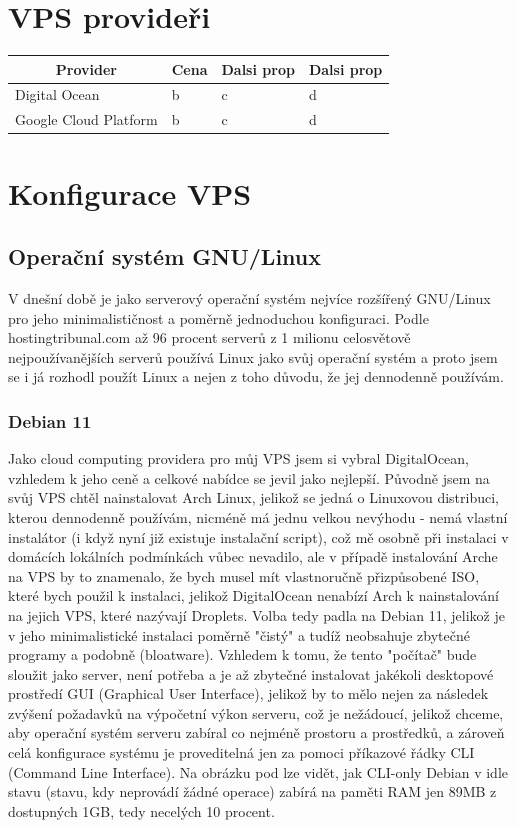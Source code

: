 \documentclass[12pt,a4paper]{report}
\begin{document}
  \section{VPS provideři}
  
  \begin{center}
    \begin{tabular}{|l|l|l|l|}
      \multicolumn{1}{c}{\bfseries Provider} & \multicolumn{1}{c}{\bfseries Cena} & \multicolumn{1}{c}{\bfseries Dalsi prop} & \multicolumn{1}{c}{\bfseries Dalsi prop} \\ \hline
      Digital Ocean & b & c & d \\ \hline
      Google Cloud Platform & b & c & d \\ \hline
      \end{tabular}
  \end{center}

  \section{Konfigurace VPS}
  \subsection{Operační systém GNU/Linux}
  V dnešní době je jako serverový operační systém nejvíce rozšířený GNU/Linux pro jeho
  minimalističnost a poměrně jednoduchou konfiguraci. Podle hostingtribunal.com až 96 procent serverů z
  1 milionu celosvětově nejpoužívanějších serverů používá Linux jako svůj operační systém a proto
  jsem se i já rozhodl použít Linux a nejen z toho důvodu, že jej dennodenně používám.
  \subsubsection{Debian 11}
  Jako cloud computing providera pro můj VPS jsem si vybral DigitalOcean, vzhledem k jeho ceně a
  celkové nabídce se jevil jako nejlepší. Původně jsem na svůj VPS chtěl nainstalovat Arch Linux,
  jelikož se jedná o Linuxovou distribuci, kterou dennodenně používám, nicméně má jednu velkou
  nevýhodu - nemá vlastní instalátor (i když nyní již existuje instalační script), což mě osobně při
  instalaci v domácích lokálních podmínkách vůbec nevadilo, ale v případě instalování Arche na VPS
  by to znamenalo, že bych musel mít vlastnoručně přizpůsobené ISO, které bych použil k instalaci,
  jelikož DigitalOcean nenabízí Arch k nainstalování na jejich VPS, které nazývají Droplets.
  Volba tedy padla na Debian 11, jelikož je v jeho minimalistické instalaci poměrně "čistý" a tudíž
  neobsahuje zbytečné programy a podobně (bloatware). Vzhledem k tomu, že tento "počítač" bude
  sloužit jako server, není potřeba a je až zbytečné instalovat jakékoli desktopové prostředí GUI
  (Graphical User Interface), jelikož by to mělo nejen za následek zvýšení požadavků na výpočetní
  výkon serveru, což je nežádoucí, jelikož chceme, aby operační systém serveru zabíral co nejméně
  prostoru a prostředků, a zároveň celá konfigurace systému je proveditelná jen za pomoci
  příkazové řádky CLI (Command Line Interface). Na obrázku pod lze vidět, jak CLI-only Debian v idle
  stavu (stavu, kdy neprovádí žádné operace) zabírá na paměti RAM jen 89MB z dostupných 1GB,
  tedy necelých 10 procent.
\end{document}
